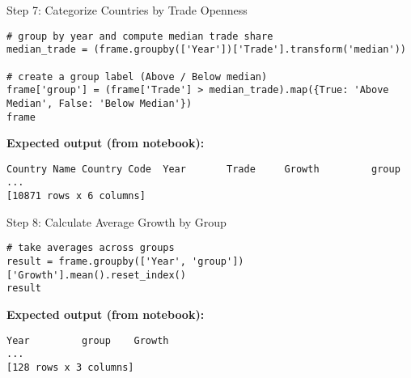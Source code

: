 \documentclass[notes,11pt, aspectratio=169, xcolor=table]{beamer}
\begin{document}
\begin{frame}[fragile]{Step 7: Categorize Countries by Trade Openness}
\begin{verbatim}
# group by year and compute median trade share
median_trade = (frame.groupby(['Year'])['Trade'].transform('median'))

# create a group label (Above / Below median)
frame['group'] = (frame['Trade'] > median_trade).map({True: 'Above Median', False: 'Below Median'})
frame
\end{verbatim}
\vspace{0.5ex}
\textbf{Expected output (from notebook):}
\begin{verbatim}
Country Name Country Code  Year       Trade     Growth         group
...
[10871 rows x 6 columns]
\end{verbatim}
\end{frame}

\begin{frame}[fragile]{Step 8: Calculate Average Growth by Group}
\begin{verbatim}
# take averages across groups
result = frame.groupby(['Year', 'group'])['Growth'].mean().reset_index()
result
\end{verbatim}
\vspace{0.5ex}
\textbf{Expected output (from notebook):}
\begin{verbatim}
Year         group    Growth
...
[128 rows x 3 columns]
\end{verbatim}
\end{frame}
\end{document}
